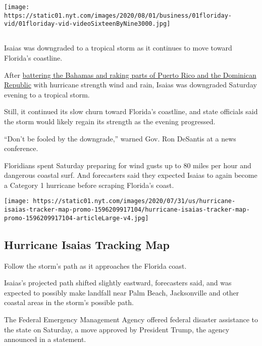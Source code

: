 \texttt{[image: https://static01.nyt.com/images/2020/08/01/business/01floriday-vid/01floriday-vid-videoSixteenByNine3000.jpg]}

\subsection{}

Isaias was downgraded to a tropical storm as it continues to move toward
Florida's coastline.

After
\href{https://www.nytimes.com/2020/07/31/us/hurricane-isaias.html}{battering
the Bahamas and raking parts of Puerto Rico and the Dominican Republic}
with hurricane strength wind and rain, Isaias was downgraded Saturday
evening to a tropical storm.

Still, it continued its slow churn toward Florida's coastline, and state
officials said the storm would likely regain its strength as the evening
progressed.

``Don't be fooled by the downgrade,'' warned Gov. Ron DeSantis at a news
conference.

Floridians spent Saturday preparing for wind gusts up to 80 miles per
hour and dangerous coastal surf. And forecasters said they expected
Isaias to again become a Category 1 hurricane before scraping Florida's
coast.

\href{https://www.nytimes.com/interactive/2020/07/31/us/hurricane-isaias-tracker-map.html}{}

\texttt{[image: https://static01.nyt.com/images/2020/07/31/us/hurricane-isaias-tracker-map-promo-1596209917104/hurricane-isaias-tracker-map-promo-1596209917104-articleLarge-v4.jpg]}

\hypertarget{hurricane-isaias-tracking-map}{%
\subsection{Hurricane Isaias Tracking
Map}\label{hurricane-isaias-tracking-map}}

Follow the storm's path as it approaches the Florida coast.

Isaias's projected path shifted slightly eastward, forecasters said, and
was expected to possibly make landfall near Palm Beach, Jacksonville and
other coastal areas in the storm's possible path.

The Federal Emergency Management Agency offered federal disaster
assistance to the state on Saturday, a move approved by President Trump,
the agency announced in a statement.

